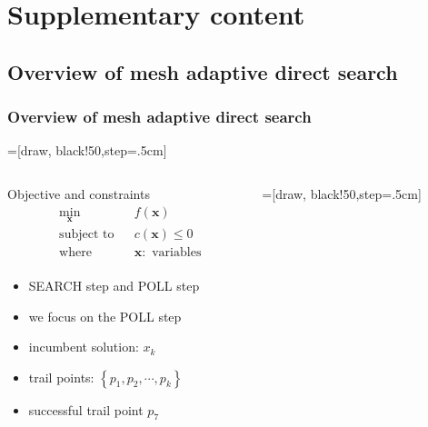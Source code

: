
\section{Supplementary content}
\subsection{Overview of mesh adaptive direct search}
\begin{frame}[t,label=abm_5]
	\frametitle{Overview of mesh adaptive direct search}
	=[draw, black!50,step=.5cm]
	\\
	\begin{columns}[t] %
		\begin{column}{.42\textwidth} %
			\vspace{-1.2em}
			\begin{exampleblock}{Objective and constraints}
				\begin{equation*}
					\begin{aligned}
						& \underset{\mathbf{x}}{\text{min}}
						& & f(\mathbf{x})\\
						& \text{subject to}
						& & {c}(\mathbf{x}) \le 0\\
						& \text{where}
						& & \mathbf{x}:\text{ variables}\\
					\end{aligned}
				\end{equation*}
			\end{exampleblock}

			\small
			\begin{itemize}\itemsep0em
				\item SEARCH step and POLL step
				\item<2-> we focus on the POLL step
				\item<3-> incumbent solution: $x_k$
				\item<4-> trail points: $\left\{p_1,p_2,\cdots,p_k\right\}$
				\item<10-> successful trail point $p_7$
			\end{itemize}
		\end{column}
		\begin{column}{.5\textwidth} %
			=[draw, black!50,step=.5cm]
			

\end{column}
\end{columns}
\end{frame}
